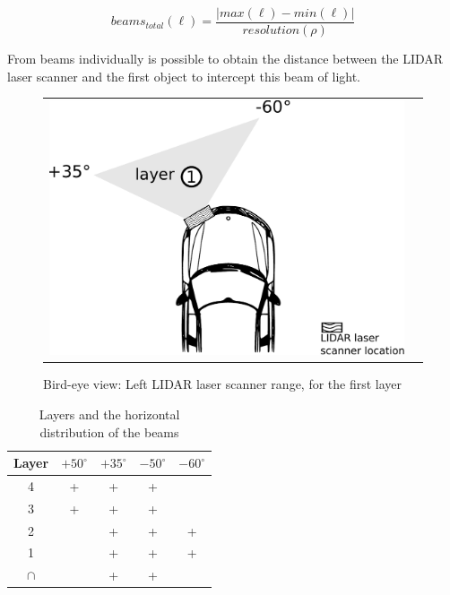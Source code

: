 \begin{equation}
\label{eq:totalbeams}
beams_{total}(\ell)=\frac{|max(\ell)-min(\ell)|}{resolution(\rho)}
\end{equation}


From beams individually is possible to obtain the distance between the LIDAR laser scanner and the first object to intercept this beam of light.

\begin{figure}[h]
   \centering
     \begin{tabular}{lr}
       \includegraphics[scale=0.5]{img/fig:demonstrator:superior}
     \end{tabular}
   \caption{Bird-eye view: Left LIDAR laser scanner range, for the first layer}
   \label{fig:demonstrator:superior}
\end{figure}


\begin{table}
\label{tab:beam:interception}
	\begin{center}
	    \begin{tabular}{ | c | c | c | c | c |}
		    \hline
		    Layer & $+50^\circ$ & $+35^\circ$ & $-50^\circ$ & $-60^\circ$ \\ \hline
		    4 & + & + & + &  \\ \hline
		    3 & + & + & + &  \\ \hline
		    2 &  & + & + & + \\ \hline
		    1 &  & + & + & + \\ \hline
		    $\cap$ &  & + & + &  \\ \hline
	    \end{tabular}
	\end{center}
    \caption{Layers and the horizontal distribution of the beams}
\end{table}

